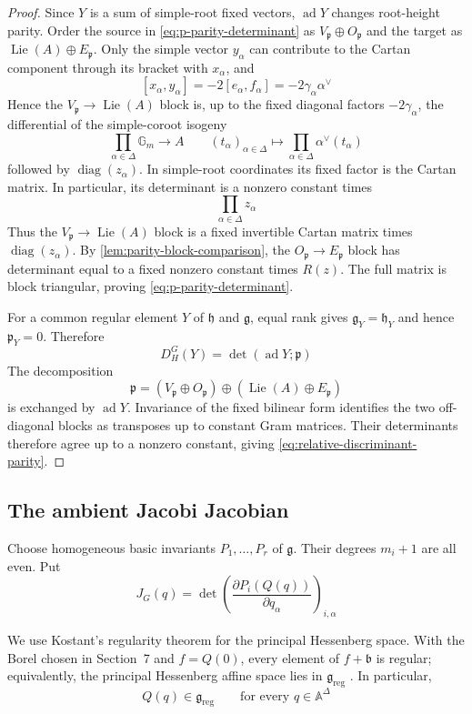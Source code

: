 \documentclass[11pt]{amsart}
\theoremstyle{definition}
\theoremstyle{remark}
\newcommand{\A}{\mathbb A}
\newcommand{\Gm}{\mathbb G_m}
\newcommand{\Lie}{\operatorname{Lie}}
\newcommand{\ad}{\operatorname{ad}}
\newcommand{\diag}{\operatorname{diag}}
\newcommand{\g}{\mathfrak g}
\newcommand{\h}{\mathfrak h}
\newcommand{\p}{\mathfrak p}
\begin{document}
\begin{proof}
Since $Y$ is a sum of simple-root fixed vectors, $\ad Y$ changes root-height
parity.  Order the source in \eqref{eq:p-parity-determinant} as
$V_\p\oplus O_\p$ and the target as $\Lie(A)\oplus E_\p$. Only the simple vector $y_\alpha$ can contribute to the Cartan component through its bracket with $x_\alpha$, and
\[
[x_\alpha,y_\alpha]
=-2[e_\alpha,f_\alpha]
=-2\gamma_\alpha\alpha^\vee
\]
Hence the $V_\p\to\Lie(A)$ block is, up to the fixed diagonal factors
$-2\gamma_\alpha$, the differential of the simple-coroot isogeny
\[
\prod_{\alpha\in\Delta}\Gm\longrightarrow A
\qquad
(t_\alpha)_{\alpha\in\Delta}\longmapsto
\prod_{\alpha\in\Delta}\alpha^\vee(t_\alpha)
\]
followed by $\diag(z_\alpha)$. In simple-root coordinates its fixed factor is
the Cartan matrix. In particular, its determinant is a nonzero constant times
\[
\prod_{\alpha\in\Delta} z_\alpha
\]
Thus the $V_\p\to\Lie(A)$ block is a fixed invertible Cartan matrix times
$\diag(z_\alpha)$.  By \cref{lem:parity-block-comparison}, the
$O_\p\to E_\p$ block has determinant equal to a fixed nonzero constant times
$R(z)$.  The full matrix is block triangular, proving
\eqref{eq:p-parity-determinant}.

For a common regular element $Y$ of $\h$ and $\g$, equal rank gives
$\g_Y=\h_Y$ and hence $\p_Y=0$.  Therefore
\[
 D_H^G(Y)=\det(\ad Y;\p)
\]
The decomposition
\[
 \p=(V_\p\oplus O_\p)\oplus(\Lie(A)\oplus E_\p)
\]
is exchanged by $\ad Y$.  Invariance of the fixed bilinear form identifies
the two off-diagonal blocks as transposes up to constant Gram matrices.
Their determinants therefore agree up to a nonzero constant, giving
\eqref{eq:relative-discriminant-parity}.
\end{proof}

\subsection{The ambient Jacobi Jacobian}

Choose homogeneous basic invariants $P_1,\ldots,P_r$ of $\g$.  Their degrees
$m_i+1$ are all even.  Put
\begin{equation}\label{eq:ambient-jacobi-jacobian}
 J_G(q)=\det\left(
 \frac{\partial P_i(Q(q))}{\partial q_\alpha}
 \right)_{i,\alpha}
\end{equation}

We use Kostant's regularity theorem for the principal Hessenberg space.  With
the Borel chosen in Section~7 and $f=Q(0)$, every element of
$f+\mathfrak b$ is regular; equivalently, the principal Hessenberg affine
space lies in $\g_{\mathrm{reg}}$ \cite{KostantToda}.  In particular,
\begin{equation}\label{eq:jacobi-everywhere-regular}
 Q(q)\in\g_{\mathrm{reg}}
 \qquad\text{for every }q\in\A^\Delta
\end{equation}
\end{document}
